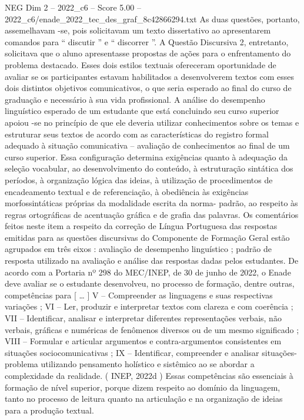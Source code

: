 \begin{textsample}{NEG Dim 2 – 2022\_c6 – Score 5.00 – 2022\_c6/enade\_2022\_tec\_des\_graf\_8c42866294.txt}
As duas questões, portanto, assemelhavam -se, pois solicitavam um texto dissertativo ao apresentarem comandos para “ discutir ” e “ discorrer ”.
A Questão Discursiva 2, entretanto, solicitava que o aluno apresentasse propostas de ações para o enfrentamento do problema destacado.
Esses dois estilos textuais ofereceram oportunidade de avaliar se os participantes estavam habilitados a desenvolverem textos com esses dois distintos objetivos comunicativos, o que seria esperado ao final do curso de graduação e necessário à sua vida profissional.
A análise do desempenho linguístico esperado de um estudante que está concluindo seu curso superior apoiou -se no princípio de que ele deveria utilizar conhecimentos sobre os temas e estruturar seus textos de acordo com as características do registro formal adequado à situação comunicativa – avaliação de conhecimentos ao final de um curso superior.
Essa configuração determina exigências quanto à adequação da seleção vocabular, ao desenvolvimento do conteúdo, à estruturação sintática dos períodos, à organização lógica das ideias, à utilização de procedimentos de encadeamento textual e de referenciação, à obediência às exigências morfossintáticas próprias da modalidade escrita da norma- padrão, ao respeito às regras ortográficas de acentuação gráfica e de grafia das palavras.
Os comentários feitos neste item a respeito da correção de Língua Portuguesa das respostas emitidas para as questões discursivas do Componente de Formação Geral estão agrupados em três eixos : avaliação de desempenho linguístico ; padrão de resposta utilizado na avaliação e análise das respostas dadas pelos estudantes.
De acordo com a Portaria nº 298 do MEC/INEP, de 30 de junho de 2022, o Enade deve avaliar se o estudante desenvolveu, no processo de formação, dentre outras, competências para [ … ] V – Compreender as linguagens e suas respectivas variações ; VI – Ler, produzir e interpretar textos com clareza e com coerência ; VII – Identificar, analisar e interpretar diferentes representações verbais, não verbais, gráficas e numéricas de fenômenos diversos ou de um mesmo significado ; VIII – Formular e articular argumentos e contra-argumentos consistentes em situações sociocomunicativas ; IX – Identificar, compreender e analisar situações-problema utilizando pensamento holístico e sistêmico ao se abordar a complexidade da realidade. ( INEP, 2022d ) Essas competências são essenciais à formação de nível superior, porque dizem respeito ao domínio da linguagem, tanto no processo de leitura quanto na articulação e na organização de ideias para a produção textual.

\end{textsample}
